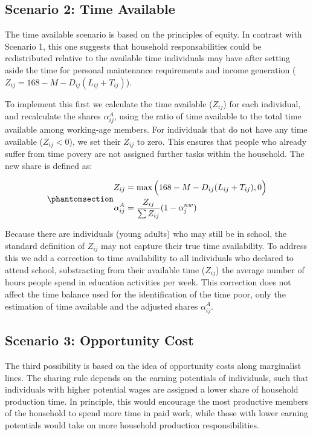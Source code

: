 \documentclass[
  11pt,
]{article}
\begin{document}
\subsection{Scenario 2: Time Available}\label{scenario-2-time-available}

The time available scenario is based on the principles of equity. In
contrast with Scenario 1, this one suggests that household
responsabilities could be redistributed relative to the available time
individuals may have after setting aside the time for personal
maintenance requirements and income generation
(\(Z_{ij}=168-M-D_{ij}(L_{ij}+T_{ij})\)).

To implement this first we calculate the time available (\(Z_{ij}\)) for
each individual, and recalculate the shares \(\alpha_{ij}^A\), using the
ratio of time available to the total time available among working-age
members. For individuals that do not have any time available
(\(Z_{ij}<0\)), we set their \(Z_{ij}\) to zero. This ensures that
people who already suffer from time povery are not assigned further
tasks within the household. The new share is defined as:

\begin{equation}\phantomsection\label{eq-r2}{
\begin{aligned}
Z_{ij} &=\max{\Big(168-M-D_{ij}(L_{ij}+T_{ij}),0\Big)} \\
\alpha_{ij}^A &= \frac{Z_{ij}}{\sum Z_{ij}} (1-\alpha_{j}^{nw})
\end{aligned}
}\end{equation}

Because there are individuals (young adults) who may still be in school,
the standard definition of \(Z_{ij}\) may not capture their true time
availability. To address this we add a correction to time availability
to all individuals who declared to attend school, substracting from
their available time (\(Z_{ij}\)) the average number of hours people
spend in education activities per week. This correction does not affect
the time balance used for the identification of the time poor, only the
estimation of time available and the adjusted shares \(\alpha_{ij}^A\).

\subsection{Scenario 3: Opportunity
Cost}\label{scenario-3-opportunity-cost}

The third possibility is based on the idea of opportunity costs along
marginalist lines. The sharing rule depends on the earning potentials of
individuals, such that individuals with higher potential wages are
assigned a lower share of household production time. In principle, this
would encourage the most productive members of the household to spend
more time in paid work, while those with lower earning potentials would
take on more household production responsibilities.
\end{document}
